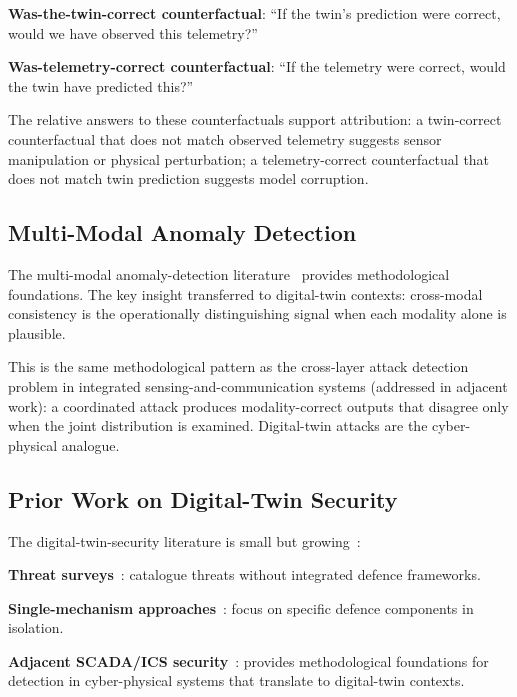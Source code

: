 \documentclass[sigconf,nonacm]{acmart}
\begin{document}
\textbf{Was-the-twin-correct counterfactual}: ``If the twin's
prediction were correct, would we have observed this telemetry?''

\textbf{Was-telemetry-correct counterfactual}: ``If the telemetry
were correct, would the twin have predicted this?''

The relative answers to these counterfactuals support
attribution: a twin-correct counterfactual that does not match
observed telemetry suggests sensor manipulation or physical
perturbation; a telemetry-correct counterfactual that does not
match twin prediction suggests model corruption.

\subsection{Multi-Modal Anomaly Detection}

The multi-modal anomaly-detection
literature~\cite{ramachandram2017multimodal,liu2024multimodalsurv}
provides methodological foundations. The key insight transferred
to digital-twin contexts: cross-modal consistency is the
operationally distinguishing signal when each modality alone is
plausible.

This is the same methodological pattern as the cross-layer attack
detection problem in integrated sensing-and-communication systems
(addressed in adjacent work): a coordinated attack produces
modality-correct outputs that disagree only when the joint
distribution is examined. Digital-twin attacks are the
cyber-physical analogue.

\subsection{Prior Work on Digital-Twin Security}

The digital-twin-security literature is small but
growing~\cite{kandasamy2024dtsecsurv,suhail2024dtsecthreat}:

\textbf{Threat surveys}~\cite{kandasamy2024dtsecsurv,
suhail2024dtsecthreat}: catalogue threats without integrated
defence frameworks.

\textbf{Single-mechanism approaches}~\cite{he2024dtdetect,
salim2024dtprivacy}: focus on specific defence components in
isolation.

\textbf{Adjacent SCADA/ICS security}~\cite{krotofil2024icssec,
moustafa2024nidssurv}: provides methodological foundations for
detection in cyber-physical systems that translate to
digital-twin contexts.
\end{document}
